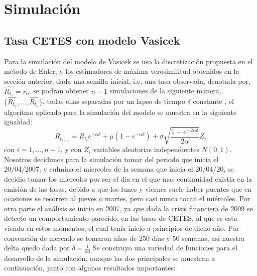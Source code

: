 \documentclass[11pt,notitlepage]{article}
\begin{document}
\section{Simulación}
\subsection{Tasa CETES con modelo Vasicek}
Para la simulación del modelo de Vasicek se uso la discretización propuesta en el método de Euler, y los estimadores de máxima verosimilitud obtenidos en la sección anterior, dada una semilla inicial, i.e, una tasa observada, denotada por, 
\(\hat{R_{t_1}} = r_{0}\), se podran obtener \(n-1\) simulaciones de la siguiente manera, \(\{\hat{R_{t_2}},\hdots,\hat{R_{t_n}}\}\), todas ellas separadas por un lapso de tiempo \(\delta\) constante , el algoritmo aplicado para la simulación del modelo se muestra en la siguiente igualdad: 
\[
    R_{t_{i+1}} = R_{t_i}e^{-\alpha \delta} + \mu\left(1 -  e^{-\alpha \delta}\right) + \sigma \sqrt{\frac{1 -  e^{-2\alpha \delta}}{2\alpha}}Z_{i}
\]
con \(i = 1,\hdots,n-1\), y con \(Z_i\) variables aleatorias independientes \(N(0,1)\). 
Nosotros decidimos para la simulación tomar del periodo que inicia el 20/04/2007, y culmina el miercoles de la semana que inicia el 20/04/20, se decidio tomar los miercoles por ser el dia en el que mas continuidad existia en la emisión de las tasas, debido a que los lunes y viernes suele haber puentes que en ocasiones se recorren al jueves o martes, pero casí nunca tocan el miércoles. Por otra parte el análisis se inicio en 2007, ya que dada la crisis financiera de 2009 se detecto un comportamiento parecido, en las tasas de CETES, al que se esta viendo en estos momentos, el cual tenia inicio a principios de dicho año. Por convención de mercado se tomaron años de 250 días y 50 semanas, así nuestra delta quedo dada por \(\delta = \frac{1}{50}\) 
Se construyo una variedad de funciones para el desarrollo de la simulación, aunque las dos principales se muestran a continuación, junto con algunos resultados importantes: 
\end{document}
